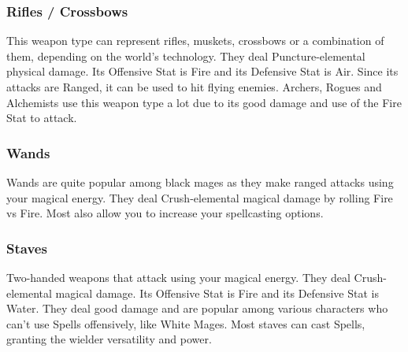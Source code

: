 \begin{tabwpn}[label=inv-throwing-weapons,range=ranged,type=physical,element=puncture,roll=earthvair]
    
\end{tabwpn}
\clearpage

\subsubsection{Rifles / Crossbows}

This weapon type can represent rifles, muskets, crossbows or a combination of them, depending on the world’s technology. They deal Puncture-elemental physical damage. Its Offensive Stat is Fire and its Defensive Stat is Air. Since its attacks are Ranged, it can be used to hit flying enemies. Archers, Rogues and Alchemists use this weapon type a lot due to its good damage and use of the Fire Stat to attack.

\begin{tabwpn}[label=inv-rifles-crossbows,range=ranged,type=physical,element=puncture,roll=firevair]
    
\end{tabwpn}
\clearpage

\subsubsection{Wands}

Wands are quite popular among black mages as they make ranged attacks using your magical energy. They deal Crush-elemental magical damage by rolling Fire vs Fire. Most also allow you to increase your spellcasting options.

\begin{tabwpn}[label=inv-wands,range=ranged,type=magical,element=crush,roll=firevfire]
    
\end{tabwpn}
\clearpage

\subsubsection{Staves}

Two-handed weapons that attack using your magical energy. They deal Crush-elemental magical damage. Its Offensive Stat is Fire and its Defensive Stat is Water. They deal good damage and are popular among various characters who can’t use Spells offensively, like White Mages. Most staves can cast Spells, granting the wielder versatility and power.

